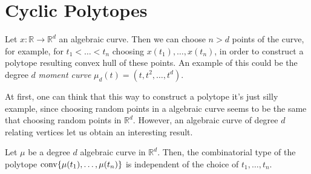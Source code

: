 \chapter{Cyclic Polytopes}


\newcommand{\R}{\mathbb{R}}

Let $x\colon \R \rightarrow \R^d$ an algebraic curve. Then we can choose $n>d$ points of the curve, for example, for $t_1<\dots<t_n$ choosing $x(t_1),\dots,x(t_n)$, in order to construct a polytope resulting convex hull of these points. An example of this could be the degree $d$ \emph{moment curve} $\mu_d(t) = (t,t^2,\dots,t^d)$.

At first, one can think that this way to construct a polytope it's just silly example, since choosing random points in a algebraic curve seems to be the same that choosing random points in $\R^d$. However, an algebraic curve of degree $d$ relating vertices let us obtain an interesting result.

\begin{theorem}
  Let $\mu$ be a degree $d$ algebraic curve in $\R^d$. Then, the combinatorial type of the polytope $\operatorname{conv}\{\mu(t_1),\dots,\mu(t_n)\}$ is independent of the choice of $t_1,\dots,t_n$.
\end{theorem}
